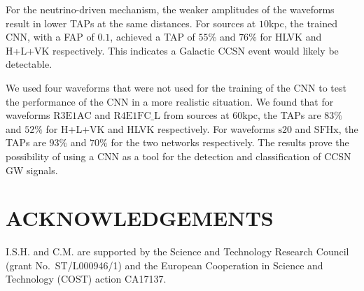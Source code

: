 \documentclass[aps,twocolumn,showpacs,groupedaddress, nofootinbib]{revtex4}  %
\begin{document}
%
%
For the neutrino-driven mechanism, the weaker amplitudes of the waveforms
result in lower \acp{TAP} at the same distances.  For sources at $10$kpc, the
trained \ac{CNN}, with a \ac{FAP} of $0.1$, achieved a \ac{TAP} of $55\%$ and
$76\%$ for HLVK and H+L+VK respectively. This indicates a Galactic \ac{CCSN}
event would likely be detectable.

%
%
We used four waveforms that were not used for the training of the \ac{CNN} to
test the performance of the \ac{CNN} in a more realistic situation. We found
that for waveforms $\text{R3E1AC}$ and $\text{R4E1FC\_L}$ from sources at
$60$kpc, the \acp{TAP} are $83\%$ and $52\%$ for H+L+VK and HLVK respectively.
For waveforms $\text{s}20$ and $\text{SFHx}$, the \acp{TAP} are $93\%$ and
$70\%$ for the two networks respectively. The results prove the possibility of
using a \ac{CNN} as a tool for the detection and classification of \ac{CCSN}
\ac{GW} signals.

\section*{ACKNOWLEDGEMENTS}
%
%
%
I.S.H. and C.M. are supported by the Science and Technology Research Council
(grant No.~ST/L000946/1) and the European Cooperation in Science and
Technology (COST) action CA17137. 


\end{document}

